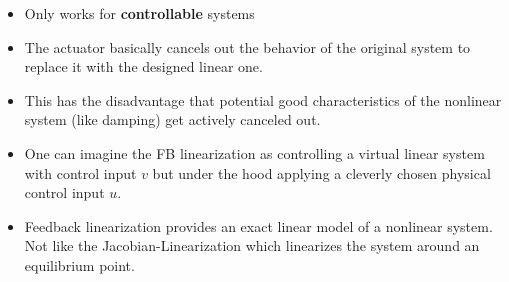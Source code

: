 \newpar{}
\begin{itemize}
    \item Only works for \textbf{controllable} systems
    \item The actuator basically cancels out the behavior of the original system to replace it with the designed linear one.
    \item This has the disadvantage that potential good characteristics of the nonlinear system (like damping) get actively canceled out.
    \item One can imagine the FB linearization as controlling a virtual linear system with control input $v$ but under the hood applying a cleverly chosen physical control input $u$.
    \item Feedback linearization provides an exact linear model of a nonlinear system. Not like the Jacobian-Linearization which linearizes the system around an equilibrium point.
\end{itemize}

